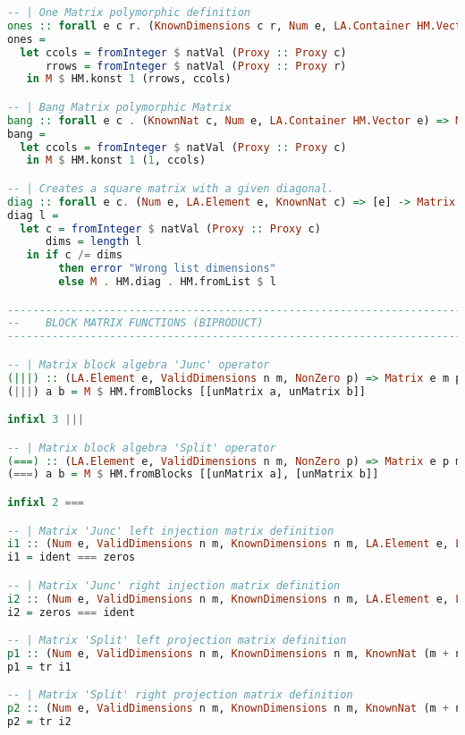 \documentclass[
  oneside,
  11pt, a4paper,
  footinclude=true,
  headinclude=true,
  cleardoublepage=empty
]{scrbook}
\theoremstyle{definition}
\theoremstyle{definition}
\begin{document}
\begin{lstlisting}[language=Haskell, caption={Matrix.Internal},captionpos=b]
-- | One Matrix polymorphic definition
ones :: forall e c r. (KnownDimensions c r, Num e, LA.Container HM.Vector e) => Matrix e c r
ones =
  let ccols = fromInteger $ natVal (Proxy :: Proxy c)
      rrows = fromInteger $ natVal (Proxy :: Proxy r)
   in M $ HM.konst 1 (rrows, ccols)

-- | Bang Matrix polymorphic Matrix
bang :: forall e c . (KnownNat c, Num e, LA.Container HM.Vector e) => Matrix e c 1
bang =
  let ccols = fromInteger $ natVal (Proxy :: Proxy c)
   in M $ HM.konst 1 (1, ccols)

-- | Creates a square matrix with a given diagonal.
diag :: forall e c. (Num e, LA.Element e, KnownNat c) => [e] -> Matrix e c c
diag l =
  let c = fromInteger $ natVal (Proxy :: Proxy c)
      dims = length l
   in if c /= dims
        then error "Wrong list dimensions"
        else M . HM.diag . HM.fromList $ l

-------------------------------------------------------------------------------
--    BLOCK MATRIX FUNCTIONS (BIPRODUCT)
-------------------------------------------------------------------------------

-- | Matrix block algebra 'Junc' operator
(|||) :: (LA.Element e, ValidDimensions n m, NonZero p) => Matrix e m p -> Matrix e n p -> Matrix e (m + n) p
(|||) a b = M $ HM.fromBlocks [[unMatrix a, unMatrix b]]

infixl 3 |||

-- | Matrix block algebra 'Split' operator
(===) :: (LA.Element e, ValidDimensions n m, NonZero p) => Matrix e p m -> Matrix e p n -> Matrix e p (m + n)
(===) a b = M $ HM.fromBlocks [[unMatrix a], [unMatrix b]]

infixl 2 ===

-- | Matrix 'Junc' left injection matrix definition
i1 :: (Num e, ValidDimensions n m, KnownDimensions n m, LA.Element e, LA.Container HM.Vector e) => Matrix e m (m + n)
i1 = ident === zeros

-- | Matrix 'Junc' right injection matrix definition
i2 :: (Num e, ValidDimensions n m, KnownDimensions n m, LA.Element e, LA.Container HM.Vector e) => Matrix e n (m + n)
i2 = zeros === ident

-- | Matrix 'Split' left projection matrix definition
p1 :: (Num e, ValidDimensions n m, KnownDimensions n m, KnownNat (m + n), LA.Element e, LA.Container HM.Vector e) => Matrix e (m + n) m
p1 = tr i1

-- | Matrix 'Split' right projection matrix definition
p2 :: (Num e, ValidDimensions n m, KnownDimensions n m, KnownNat (m + n), LA.Element e, LA.Container HM.Vector e) => Matrix e (m + n) n
p2 = tr i2


\end{lstlisting}
\end{document}
